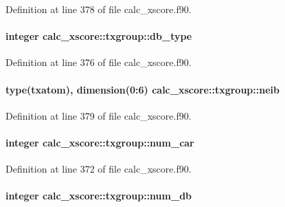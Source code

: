Definition at line 378 of file calc\-\_\-xscore.\-f90.

\hypertarget{structcalc__xscore_1_1txgroup_abed09b58f368c98556aeb2a36fe549e6}{
\paragraph[{db\-\_\-type}]{\setlength{\rightskip}{0pt plus 5cm}integer calc\-\_\-xscore\-::txgroup\-::db\-\_\-type}}\label{structcalc__xscore_1_1txgroup_abed09b58f368c98556aeb2a36fe549e6}


Definition at line 376 of file calc\-\_\-xscore.\-f90.

\hypertarget{structcalc__xscore_1_1txgroup_aa001da5f22731f7cb5ca4113c407e502}{
\paragraph[{neib}]{\setlength{\rightskip}{0pt plus 5cm}type({\bf txatom}), dimension(0\-:6) calc\-\_\-xscore\-::txgroup\-::neib}}\label{structcalc__xscore_1_1txgroup_aa001da5f22731f7cb5ca4113c407e502}


Definition at line 379 of file calc\-\_\-xscore.\-f90.

\hypertarget{structcalc__xscore_1_1txgroup_ab43d1f98f266fca2fa360c4605fedbb2}{
\paragraph[{num\-\_\-car}]{\setlength{\rightskip}{0pt plus 5cm}integer calc\-\_\-xscore\-::txgroup\-::num\-\_\-car}}\label{structcalc__xscore_1_1txgroup_ab43d1f98f266fca2fa360c4605fedbb2}


Definition at line 372 of file calc\-\_\-xscore.\-f90.

\hypertarget{structcalc__xscore_1_1txgroup_ade68eb6db76ca49fbbb32db18bf47627}{
\paragraph[{num\-\_\-db}]{\setlength{\rightskip}{0pt plus 5cm}integer calc\-\_\-xscore\-::txgroup\-::num\-\_\-db}}\label{structcalc__xscore_1_1txgroup_ade68eb6db76ca49fbbb32db18bf47627}


